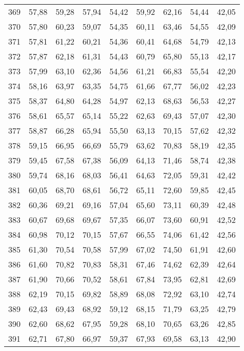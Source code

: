 \begin{longtable}{c c c c c c c c c}
      369& 	57,88& 	59,28& 	57,94& 	54,42& 	59,92& 	62,16& 	54,44& 	42,05 \\
      370& 	57,80& 	60,23& 	59,07& 	54,35& 	60,11& 	63,46& 	54,55& 	42,09 \\
      371& 	57,81& 	61,22& 	60,21& 	54,36& 	60,41& 	64,68& 	54,79& 	42,13 \\
      372& 	57,87& 	62,18& 	61,31& 	54,43& 	60,79& 	65,80& 	55,13& 	42,17 \\
      373& 	57,99& 	63,10& 	62,36& 	54,56& 	61,21& 	66,83& 	55,54& 	42,20 \\
      374& 	58,16& 	63,97& 	63,35& 	54,75& 	61,66& 	67,77& 	56,02& 	42,23 \\
      375& 	58,37& 	64,80& 	64,28& 	54,97& 	62,13& 	68,63& 	56,53& 	42,27 \\
      376& 	58,61& 	65,57& 	65,14& 	55,22& 	62,63& 	69,43& 	57,07& 	42,30 \\
      377& 	58,87& 	66,28& 	65,94& 	55,50& 	63,13& 	70,15& 	57,62& 	42,32 \\
      378& 	59,15& 	66,95& 	66,69& 	55,79& 	63,62& 	70,83& 	58,19& 	42,35 \\
      379& 	59,45& 	67,58& 	67,38& 	56,09& 	64,13& 	71,46& 	58,74& 	42,38 \\
      380& 	59,74& 	68,16& 	68,03& 	56,41& 	64,63& 	72,05& 	59,31& 	42,42 \\
      381& 	60,05& 	68,70& 	68,61& 	56,72& 	65,11& 	72,60& 	59,85& 	42,45 \\
      382& 	60,36& 	69,21& 	69,16& 	57,04& 	65,60& 	73,11& 	60,39& 	42,48 \\
      383& 	60,67& 	69,68& 	69,67& 	57,35& 	66,07& 	73,60& 	60,91& 	42,52 \\
      384& 	60,98& 	70,12& 	70,15& 	57,67& 	66,55& 	74,06& 	61,42& 	42,56 \\
      385& 	61,30& 	70,54& 	70,58& 	57,99& 	67,02& 	74,50& 	61,91& 	42,60 \\
      386& 	61,60& 	70,82& 	70,83& 	58,31& 	67,46& 	74,62& 	62,39& 	42,64 \\
      387& 	61,90& 	70,66& 	70,52& 	58,61& 	67,84& 	73,95& 	62,81& 	42,69 \\
      388& 	62,19& 	70,15& 	69,82& 	58,89& 	68,08& 	72,92& 	63,10& 	42,74 \\
      389& 	62,43& 	69,43& 	68,92& 	59,12& 	68,15& 	71,79& 	63,25& 	42,79 \\
      390& 	62,60& 	68,62& 	67,95& 	59,28& 	68,10& 	70,65& 	63,26& 	42,85 \\
      391& 	62,71& 	67,80& 	66,97& 	59,37& 	67,93& 	69,58& 	63,13& 	42,90 \\

\end{longtable}
